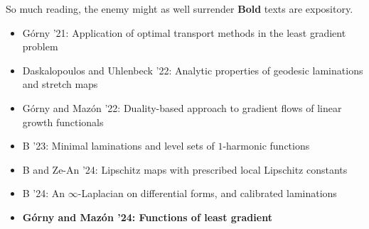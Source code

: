 \documentclass[10pt]{beamer}
\begin{document}
\begin{frame}{So much reading, the enemy might as well surrender}
\textbf{Bold} texts are expository.
\begin{itemize}
\item G\'orny '21: Application of optimal transport methods in the least gradient problem
\item Daskalopoulos and Uhlenbeck '22: Analytic properties of geodesic laminations and stretch maps
\item G\'orny and Maz\'on '22: Duality-based approach to gradient flows of linear growth functionals
\item B '23: Minimal laminations and level sets of $1$-harmonic functions 
\item B and Ze-An '24: Lipschitz maps with prescribed local Lipschitz constants
\item B '24: An $\infty$-Laplacian on differential forms, and calibrated laminations
\item \textbf{G\'orny and Maz\'on '24: Functions of least gradient}
\end{itemize}
\end{frame}
\end{document}
